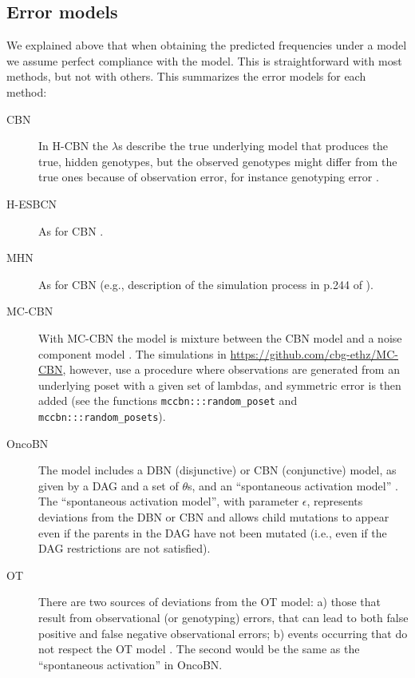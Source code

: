 \documentclass[a4paper,11pt]{article}
\begin{document}
  
\subsection{Error models}
\label{error_models}

We explained above that when obtaining the predicted frequencies under a model we assume perfect compliance with the model. This is straightforward with most methods, but not with others. This summarizes the error models for each method:

\begin{description}
\item[CBN] In H-CBN the $\lambda$s describe the true underlying model that produces the true, hidden genotypes, but the observed genotypes might differ from the true ones because of observation error, for instance genotyping error  \cite[p.~2810]{gerstung2009quantifying}.
\item[H-ESBCN] As for CBN \cite[p.~756]{angaroni2021}.
\item[MHN] As for CBN (e.g., description of the simulation process in p.244 of \citealp{schill2020modelling}).
\item[MC-CBN] With MC-CBN the model is mixture between the CBN model and a noise component model \cite[p.~i730-i731]{montazeri2016large}. The simulations in \url{https://github.com/cbg-ethz/MC-CBN}, however, use a procedure where observations are generated from an underlying poset with a given set of lambdas, and symmetric error is then added (see the functions \texttt{mccbn:::random\_poset} and \texttt{mccbn:::random\_posets}).
\item[OncoBN] The model includes a DBN (disjunctive) or CBN (conjunctive) model, as given by a DAG and a set of $\theta$s, and an ``spontaneous activation model'' \cite[p.~3-4]{nicol2021oncogenetic}. The ``spontaneous activation model'', with parameter $\epsilon$, represents deviations from the DBN or CBN and allows child mutations to appear even if the parents in the DAG have not been mutated (i.e., even if the DAG restrictions are not satisfied).
  
\item[OT] There are two sources of deviations from the OT model: a) those that result from observational (or genotyping) errors, that can lead to both false positive and false negative observational errors; b) events occurring that do not respect the OT model \cite{Szabo2002}. The second would be the same as the ``spontaneous activation'' in OncoBN.
  

\end{description}
\end{document}
